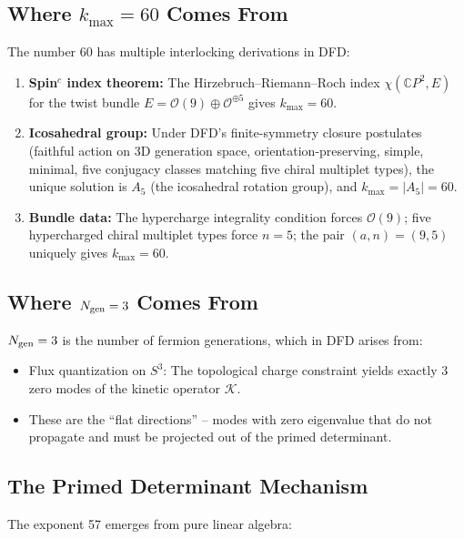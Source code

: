 \documentclass[11pt]{article}
\begin{document}
\subsection{Where $k_{\max} = 60$ Comes From}

The number 60 has multiple interlocking derivations in DFD:

\begin{enumerate}
\item \textbf{Spin$^c$ index theorem:} The Hirzebruch--Riemann--Roch index
$\chi(\mathbb{C}P^2, E)$ for the twist bundle
$E = \mathcal{O}(9) \oplus \mathcal{O}^{\oplus 5}$ gives
$k_{\max} = 60$.

\item \textbf{Icosahedral group:} Under DFD's finite-symmetry closure
postulates (faithful action on 3D generation space, orientation-preserving,
simple, minimal, five conjugacy classes matching five chiral multiplet types),
the unique solution is $A_5$ (the icosahedral rotation group), and
$k_{\max} = |A_5| = 60$.

\item \textbf{Bundle data:} The hypercharge integrality condition forces
$\mathcal{O}(9)$; five hypercharged chiral multiplet types force $n = 5$;
the pair $(a, n) = (9, 5)$ uniquely gives $k_{\max} = 60$.
\end{enumerate}

\subsection{Where $N_{\rm gen} = 3$ Comes From}

$N_{\rm gen} = 3$ is the number of fermion generations, which in DFD arises
from:
\begin{itemize}
\item Flux quantization on $S^3$: The topological charge constraint yields
exactly 3 zero modes of the kinetic operator $\mathcal{K}$.
\item These are the ``flat directions'' -- modes with zero eigenvalue that
do not propagate and must be projected out of the primed determinant.
\end{itemize}

\subsection{The Primed Determinant Mechanism}

The exponent 57 emerges from pure linear algebra:
\end{document}
